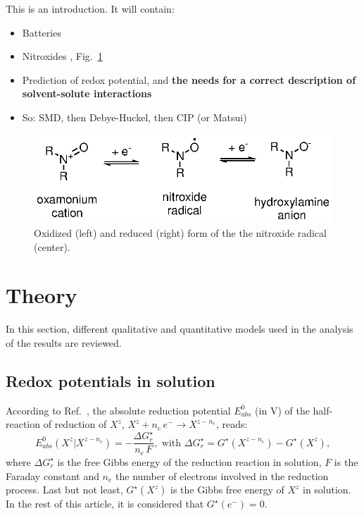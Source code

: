 \documentclass[review]{elsarticle}
\begin{document}
This is an introduction. It will contain:\begin{itemize}
	\item Batteries
	\item Nitroxides \cite{souleChemistryBiologyNitroxide2007}, Fig.~\ref{fig:states}
	\item Prediction of redox potential, and \textbf{the needs for a correct description of solvent-solute interactions}
	\item So: SMD, then Debye-Huckel, then CIP (or Matsui)
\end{itemize}

\begin{figure}[!h]
	\centering
	\includegraphics[width=.5\linewidth]{Figure1}
	\caption{Oxidized (left) and reduced (right) form of the the nitroxide radical (center).}
	\label{fig:states}
\end{figure}

\section{Theory}

In this section, different qualitative and quantitative models used in the analysis of the results are reviewed.

\subsection{Redox potentials in solution}

According to Ref.~\cite{marenichComputationalElectrochemistryPrediction2014}, the absolute reduction potential $E_{abs}^0$ (in \si{\volt}) of the half-reaction of reduction of $X^z$, $X^{z} + n_e\,e^- \rightarrow X^{z-n_e}$, reads: \begin{equation}
	E_{abs}^0(X^{z}|X^{z-n_e}) = -\frac{\Delta G_{r}^\star}{n_e\,F}, \text{ with } \Delta G_{r}^\star = G^\star(X^{z-n_e}) - G^\star(X^z), \label{eq:nernst}
\end{equation}
where $\Delta G_{r}^\star$ is the free Gibbs energy of the reduction reaction in solution, $F$ is the Faraday constant and $n_e$ the number of electrons involved in the reduction process. Last but not least, $G^\star(X^z)$ is the Gibbs free energy of $X^z$ in solution.  In the rest of this article, it is considered that $G^\star(e^-) = 0$.
\end{document}
